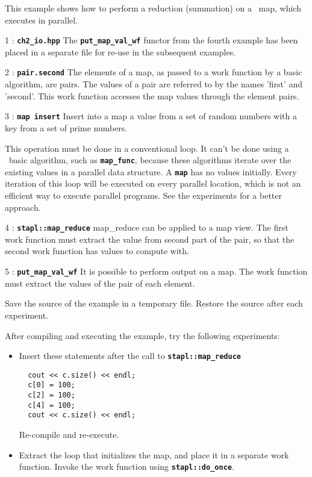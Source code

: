 \documentclass{report}
\begin{document}
This example shows how to perform a reduction (summation)
on a \stapl\ map, which executes in parallel.

\begin{hashitemize}
\item 1 : \texttt{{\bf ch2\_io.hpp}}
\newline
The
\texttt{{\bf put\_map\_val\_wf}}
functor from the fourth example has been placed in a separate file
for re-use in the subsequent examples.

\item 2 : \texttt{{\bf pair.second}}
\newline
The elements of a map, as passed to a work function by
a basic algorithm, are pairs.
The values of a pair are referred to by the names 'first' and 'second'.
This work function accesses the map values through the element pairs.

\item 3 : \texttt{{\bf map insert}}
\newline
Insert into a map a value from a set of random numbers with a key
from a set of prime numbers.

This operation must be done in a conventional loop.  It can't be done
using a \stapl\ basic algorithm, such as
\texttt{{\bf map\_func}},
because these algorithms iterate over the existing values in a parallel
data structure.  A
\texttt{{\bf map}}
has no values initially.
Every iteration of this loop will be executed on every parallel location,
which is not an efficient way to execute parallel programs.
See the experiments for a better approach.

\item 4 : \texttt{{\bf stapl::map\_reduce}}
\newline
map\_reduce can be applied to a map view.  The first work function
must extract the value from second part of the pair, so that the
second work function has values to compute with.

\item 5 : \texttt{{\bf put\_map\_val\_wf}}
\newline
It is possible to perform output on a map.  The work function must
extract the values of the pair of each element.

\end{hashitemize}

Save the source of the example in a temporary file.
Restore the source after each experiment.

After compiling and executing the example, try the following experiments:
\begin{itemize}
\item
Insert these statements after the call to
\texttt{{\bf stapl::map\_reduce}}
\begin{verbatim}
  cout << c.size() << endl;
  c[0] = 100;
  c[2] = 100;
  c[4] = 100;
  cout << c.size() << endl;
\end{verbatim}
Re-compile and re-execute.
\item
Extract the loop that initializes the map, and place it in a separate
work function.  Invoke the work function using
\texttt{{\bf stapl::do\_once}}.
\end{itemize}
\end{document}
